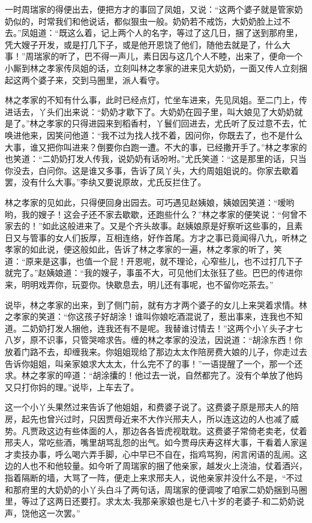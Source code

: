 \documentclass[12pt,oneside]{book}
\begin{document}
一时周瑞家的得便出去，便把方才的事回了凤姐，又说：“这两个婆子就是管家奶奶似的，时常我们和他说话，都似狠虫一般。奶奶若不戒饬，大奶奶脸上过不去。”凤姐道：“既这么着，记上两个人的名字，等过了这几日，捆了送到那府里，凭大嫂子开发，或是打几下子，或是他开恩饶了他们，随他去就是了，什么大事！”周瑞家的听了，巴不得一声儿，素日因与这几个人不睦，出来了，便命一个小厮到林之孝家传凤姐的话，立刻叫林之孝家的进来见大奶奶，一面又传人立刻捆起这两个婆子来，交到马圈里，派人看守。

林之孝家的不知有什么事，此时已经点灯，忙坐车进来，先见凤姐。至二门上，传进话去，丫头们出来说：“奶奶才歇下了。大奶奶在园子里，叫大娘见了大奶奶就是了。”林之孝家的只得进园来到稻香村，丫鬟们回进去，尤氏听了反过意不去，忙唤进他来，因笑问他道：“我不过为找人找不着，因问你，你既去了，也不是什么大事，谁又把你叫进来？倒要你白跑一遭。不大的事，已经撒开手了。”林之孝家的也笑道：“二奶奶打发人传我，说奶奶有话吩咐。”尤氏笑道：“这是那里的话，只当你没去，白问你。这是谁又多事，告诉了凤丫头，大约周姐姐说的。你家去歇着罢，没有什么大事。”李纨又要说原故，尤氏反拦住了。

林之孝家的见如此，只得便回身出园去。可巧遇见赵姨娘，姨娘因笑道：“嗳哟哟，我的嫂子！这会子还不家去歇歇，还跑些什么？”林之孝家的便笑说：“何曾不家去的！”如此这般进来了。又是个齐头故事。赵姨娘原是好察听这些事的，且素日又与管事的女人们扳厚，互相连络，好作首尾。方才之事已竟闻得八九，听林之孝家的如此说，便这般如此，告诉了林之孝家的一遍，林之孝家的听了，笑道：“原来是这事，也值一个屁！开恩呢，就不理论，心窄些儿，也不过打几下子就完了。”赵姨娘道：“我的嫂子，事虽不大，可见他们太张狂了些。巴巴的传进你来，明明戏弄你，玩耍你。快歇息去，明儿还有事呢，也不留你吃茶去。”

说毕，林之孝家的出来，到了侧门前，就有方才两个婆子的女儿上来哭着求情。林之孝家的笑道：“你这孩子好胡涂！谁叫你娘吃酒混说了，惹出事来，连我也不知道。二奶奶打发人捆他，连我还有不是呢。我替谁讨情去！”这两个小丫头子才七八岁，原不识事，只管哭啼求告。缠的林之孝家的没法，因说道：“胡涂东西！你放着门路不去，却缠我来。你姐姐现给了那边太太作陪房费大娘的儿子，你走过去告诉你姐姐，叫亲家娘求大太太，什么完不了的事！”一语提醒了一个，那一个还求。林之孝家的啐道：“胡涂攮的！他过去一说，自然都完了。没有个单放了他妈又只打你妈的理。”说毕，上车去了。

这一个小丫头果然过来告诉了他姐姐，和费婆子说了。这费婆子原是邢夫人的陪房，起先也曾兴过时，只因贾母近来不大作兴邢夫人，所以连这边的人也减了威势。凡贾政这边有些体面的人，那边各各皆虎视耽耽。这费婆子常倚老卖老，仗着邢夫人，常吃些酒，嘴里胡骂乱怨的出气。如今贾母庆寿这样大事，干看着人家逞才卖技办事，呼么喝六弄手脚，心中早已不自在，指鸡骂狗，闲言闲语的乱闹。这边的人也不和他较量。如今听了周瑞家的捆了他亲家，越发火上浇油，仗着酒兴，指着隔断的墙，大骂了一阵，便走上来求邢夫人，说他亲家并没什么不是，“不过和那府里的大奶奶的小丫头白斗了两句话，周瑞家的便调唆了咱家二奶奶捆到马圈里，等过了这两日还要打。求太太-我那亲家娘也是七八十岁的老婆子-和二奶奶说声，饶他这一次罢。”
\end{document}
